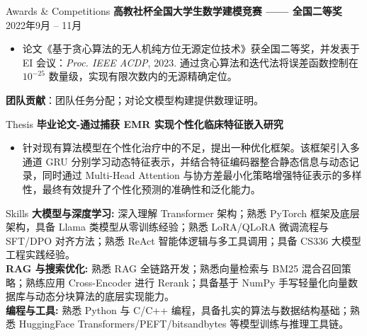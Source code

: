 \documentclass{resume}
\begin{document}

\begin{rSection}{Awards \& Competitions}
{\bf 高教社杯全国大学生数学建模竞赛 —— 全国二等奖} \hfill {2022年9月 -- 11月}
\begin{itemize}
    \item 论文《基于贪心算法的无人机纯方位无源定位技术》获全国二等奖，并发表于 EI 会议：\textit{Proc. IEEE ACDP}, 2023. 通过贪心算法和迭代法将误差函数控制在 $10^{-25}$ 数量级，实现有限次数内的无源精确定位。
\end{itemize}
\textbf{团队贡献}：团队任务分配；对论文模型构建提供数理证明。
\end{rSection}


\begin{rSection}{Thesis}
{\bf 毕业论文-通过捕获 EMR 实现个性化临床特征嵌入研究} 
\begin{itemize}
    \item 针对现有算法模型在个性化治疗中的不足，提出一种优化框架。该框架引入多通道 GRU 分别学习动态特征表示，并结合特征编码器整合静态信息与动态记录，同时通过 Multi-Head Attention 与协方\textbf{}差最小化策略增强特征表示的多样性，最终有效提升了个性化预测的准确性和泛化能力。
\end{itemize}
\end{rSection}


\begin{rSection}{Skills}
\textbf{大模型与深度学习:} 深入理解 Transformer 架构；熟悉 PyTorch 框架及底层架构，具备 Llama 类模型从零训练经验；熟悉 LoRA/QLoRA 微调流程与 SFT/DPO 对齐方法；熟悉 ReAct 智能体逻辑与多工具调用；具备 CS336 大模型工程实践经验。 \\
\textbf{RAG 与搜索优化:} 熟悉 RAG 全链路开发；熟悉向量检索与 BM25 混合召回策略；熟练应用 Cross-Encoder 进行 Rerank；具备基于 NumPy 手写轻量化向量数据库与动态分块算法的底层实现能力。 \\
\textbf{编程与工具:} 熟悉 Python 与 C/C++ 编程，具备扎实的算法与数据结构基础；熟悉 HuggingFace Transformers/PEFT/bitsandbytes 等模型训练与推理工具链。
\textbf{     }

\end{rSection}
\end{document}

